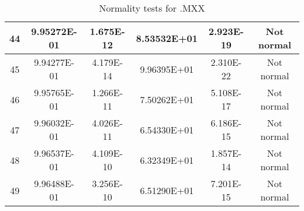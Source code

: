 \begin{table}[h]
\begin{tabular}{|c|c|c|c|c|c|}
		44 & 9.95272E-01 & 1.675E-12 & 8.53532E+01 & 2.923E-19 & Not normal\\\hline
		45 & 9.94277E-01 & 4.179E-14 & 9.96395E+01 & 2.310E-22 & Not normal\\\hline
		46 & 9.95765E-01 & 1.266E-11 & 7.50262E+01 & 5.108E-17 & Not normal\\\hline
		47 & 9.96032E-01 & 4.026E-11 & 6.54330E+01 & 6.186E-15 & Not normal\\\hline
		48 & 9.96537E-01 & 4.109E-10 & 6.32349E+01 & 1.857E-14 & Not normal\\\hline
		49 & 9.96488E-01 & 3.256E-10 & 6.51290E+01 & 7.201E-15 & Not normal\\\hline
	\end{tabular}
	\caption{Normality tests for .MXX}
	\label{tab:normality_tests_MXX}
\end{table}
